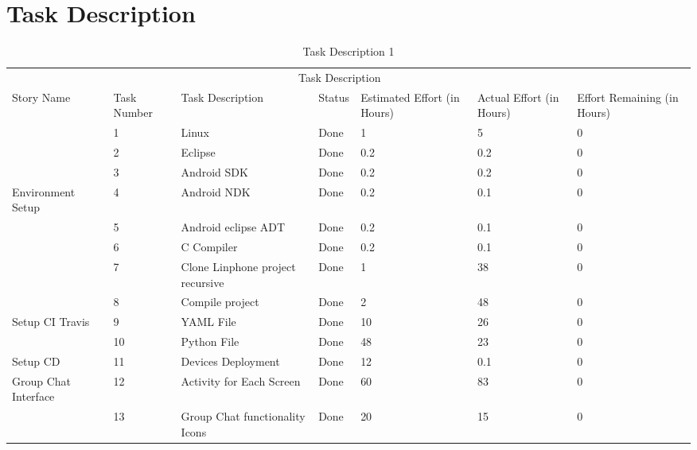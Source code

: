 \documentclass[a4paper]{article}
\begin{document}
\section{Task Description}
\begin{table} 
\begin{tabular}{p{3cm} p{1cm} p{3.5cm} p{1cm} p{1cm} p{1cm} p{1cm}} 
\hline %
& \multicolumn{5}{c}{Task Description} \\
\cmidrule(l){2-7}
Story Name & Task Number & Task Description & Status & Estimated Effort (in Hours) & Actual Effort (in Hours) & Effort Remaining (in Hours)\\ %
\hline

 & 1 & Linux & Done & 1 & 5 & 0\\ \cmidrule(l){2-6}

 & 2 & Eclipse & Done & 0.2 & 0.2 & 0\\ \cmidrule(l){2-6}

 & 3 & Android SDK & Done & 0.2  & 0.2 & 0\\ \cmidrule(l){2-6}
 
 Environment Setup & 4 & Android NDK & Done & 0.2 & 0.1 & 0\\ \cmidrule(l){2-6}

 & 5 & Android eclipse ADT & Done & 0.2 & 0.1 & 0\\ \cmidrule(l){2-6}

 & 6 & C Compiler & Done & 0.2 & 0.1 & 0\\ \cmidrule(l){2-6}
 
 & 7 & Clone Linphone project recursive & Done & 1 & 38 & 0\\ \cmidrule(l){2-6}

 & 8 &  Compile project  & Done & 2 & 48 & 0\\  
\midrule %

 Setup CI Travis & 9 & YAML File & Done & 10 & 26 & 0\\ \cmidrule(l){2-6}

 & 10 & Python File & Done & 48 & 23 & 0\\  
\midrule %

Setup CD & 11 & Devices Deployment & Done & 12 & 0.1 & 0\\
\midrule

Group Chat Interface & 12 & Activity for Each Screen & Done & 60 & 83 & 0\\ \cmidrule(l){2-6}

& 13 & Group Chat functionality Icons & Done & 20 & 15 & 0\\ 
\hline
\end{tabular}
\caption{Task Description 1} %
\label{tab:template} %
\end{table}
\end{document}
